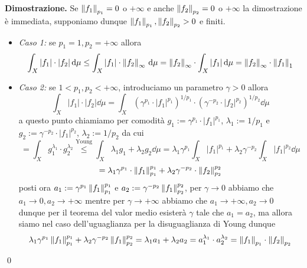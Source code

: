 
\textbf{Dimostrazione.}
Se $\left\lVert f_1 \right\rVert_{p_1} = 0$ o $+\infty$ e anche $\left\lVert f_2 \right\rVert_{p_2} = 0$ o $+\infty$ la dimostrazione è immediata, supponiamo dunque $\left\lVert f_1 \right\rVert_{p_1}, \left\lVert f_2 \right\rVert_{p_2} > 0$ e finiti.

\begin{itemize}
	\item \textit{Caso 1:} se $p_1 = 1, p_2 = +\infty$ allora
		$$
		\int_X |f_1| \cdot |f_2| \,\mathrm{d} \mu 
		\leq \int_X |f_1| \cdot \left\lVert f_2 \right\rVert_{\infty} \,\mathrm{d} \mu
		= \left\lVert f_2 \right\rVert_{\infty} \cdot \int_X |f_1| \,\mathrm{d} \mu
		= \left\lVert f_2 \right\rVert_{\infty} \cdot \left\lVert f_1 \right\rVert_{1} 
		$$

	\item \textit{Caso 2:} se $1 < p_1, p_2 < +\infty$, introduciamo un parametro $\gamma > 0$ allora
		$$
		\int_X |f_1| \cdot |f_2| \dd \mu 
		= \int_X \left( \gamma^{p_1} \cdot |f_1|^{p_1} \right)^{1/p_1} \cdot \left( \gamma^{-p_2} \cdot |f_2|^{p_2} \right)^{1/p_2} \dd \mu
		$$
		a questo punto chiamiamo per comodità $g_1 := \gamma^{p_1} \cdot |f_1|^{p_1}$, $\lambda_1 := 1 / p_1$ e $g_2 := \gamma^{-p_2} \cdot |f_1|^{p_2}$, $\lambda_2 := 1 / p_2$ da cui
		$$
		= \int_X g_1^{\lambda_1} \cdot g_2^{\lambda_2} 
		\overset{\text{Young}}{\leq} \int_X \lambda_1 g_1 + \lambda_2 g_2 \dd \mu
		= \lambda_1 \gamma^{p_1} \int_X |f_1|^{p_1} + \lambda_2 \gamma^{-p_2} \int_X |f_1|^{p_2} \dd \mu
		$$
		$$
		= \lambda_1 \gamma^{p_1} \cdot \left\lVert f_1 \right\rVert_{p_1}^{p_1} + \lambda_2 \gamma^{-p_2} \cdot \left\lVert f_2 \right\rVert_{p_2}^{p_2}
		$$
		posti ora $a_1 := \gamma^{p_1} \left\lVert f_1 \right\rVert_{p_1}^{p_1}$ e $a_2 := \gamma^{-p_2} \left\lVert f_1 \right\rVert_{p_2}^{p_2}$, per $\gamma \to 0$ abbiamo che $a_1 \to 0, a_2 \to +\infty$ mentre per $\gamma \to +\infty$ abbiamo che $a_1 \to +\infty, a_2 \to 0$ dunque per il teorema del valor medio esisterà $\gamma$ tale che $a_1 = a_2$, ma allora siamo nel caso dell'uguaglianza per la disuguaglianza di Young dunque
		$$
		\lambda_1 \gamma^{p_1} \left\lVert f_1 \right\rVert_{p_1}^{p_1} + \lambda_2 \gamma^{-p_2} \left\lVert f_1 \right\rVert_{p_2}^{p_2} 
		= \lambda_1 a_1 + \lambda_2 a_2 = a_1^{\lambda_1} \cdot a_2^{\lambda_2} 
		= \left\lVert f_1 \right\rVert_{p_1} \cdot \left\lVert f_2 \right\rVert_{p_2}
		$$
\end{itemize}
\qed


